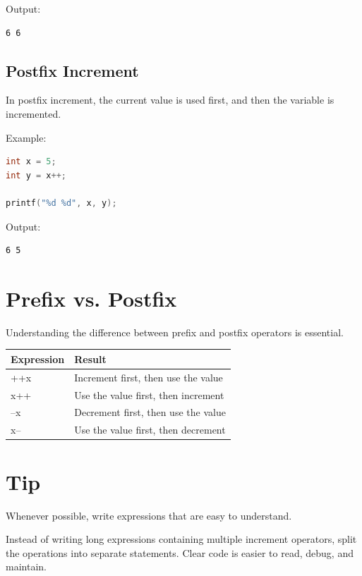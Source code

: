 \documentclass[12pt,openany]{book}
\begin{document}
Output:

\begin{lstlisting}
6 6
\end{lstlisting}

\subsection{Postfix Increment}

In postfix increment, the current value is used first, and then the variable is incremented.

Example:

\begin{lstlisting}[language=C]
int x = 5;
int y = x++;

printf("%d %d", x, y);
\end{lstlisting}

Output:

\begin{lstlisting}
6 5
\end{lstlisting}

\section{Prefix vs. Postfix}

Understanding the difference between prefix and postfix operators is essential.

\begin{center}
\begin{tabular}{|l|l|}
\hline
\textbf{Expression} & \textbf{Result} \\
\hline
++x & Increment first, then use the value \\
x++ & Use the value first, then increment \\
--x & Decrement first, then use the value \\
x-- & Use the value first, then decrement \\
\hline
\end{tabular}
\end{center}

\section{Tip}

Whenever possible, write expressions that are easy to understand.

Instead of writing long expressions containing multiple increment operators, split the operations into separate statements. Clear code is easier to read, debug, and maintain.
\end{document}
